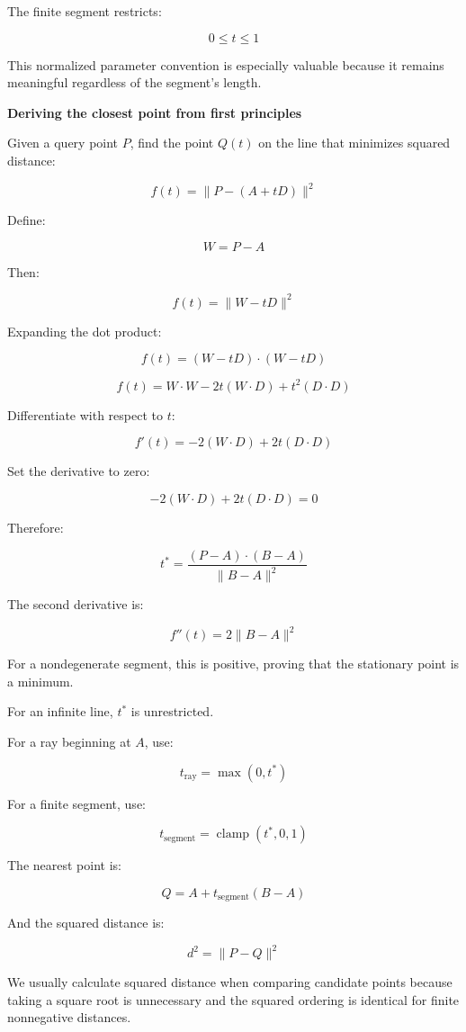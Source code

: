 The finite segment restricts:

\[
0\le t\le1
\]

This normalized parameter convention is especially valuable because it remains meaningful regardless of the segment's length.

\textbf{Deriving the closest point from first principles}

Given a query point \(P\), find the point \(Q(t)\) on the line that minimizes squared distance:

\[
f(t)=\|P-(A+tD)\|^2
\]

Define:

\[
W=P-A
\]

Then:

\[
f(t)=\|W-tD\|^2
\]

Expanding the dot product:

\[
f(t) =(W-tD)\cdot(W-tD)
\]

\[
f(t)=W\cdot W-2t(W\cdot D)+t^2(D\cdot D)
\]

Differentiate with respect to \(t\):

\[
f'(t)=-2(W\cdot D)+2t(D\cdot D)
\]

Set the derivative to zero:

\[
-2(W\cdot D)+2t(D\cdot D)=0
\]

Therefore:

\[
\boxed{ t^*=\frac{(P-A)\cdot(B-A)}{\|B-A\|^2} }
\]

The second derivative is:

\[
f''(t)=2\|B-A\|^2
\]

For a nondegenerate segment, this is positive, proving that the stationary point is a minimum.

For an infinite line, \(t^*\) is unrestricted.

For a ray beginning at \(A\), use:

\[
t_{\mathrm{ray}}=\max(0,t^*)
\]

For a finite segment, use:

\[
\boxed{ t_{\mathrm{segment}}=\operatorname{clamp}(t^*,0,1) }
\]

The nearest point is:

\[
\boxed{ Q=A+t_{\mathrm{segment}}(B-A) }
\]

And the squared distance is:

\[
\boxed{ d^2=\|P-Q\|^2 }
\]

We usually calculate squared distance when comparing candidate points because taking a square root is unnecessary and the squared ordering is identical for finite nonnegative distances.

